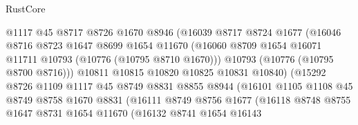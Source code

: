 \begin{lexlean}{RustCore}
\begin{coremodule}
                              @1117
                              @45
                              @8717
                              @8726
                              @1670
                              @8946
                              (@16039
                                @8717
                                @8724
                                @1677
                                (@16046
                                  @8716
                                  @8723
                                  @1647
                                  @8699
                                  @1654
                                  @11670
                                  (@16060
                                    @8709
                                    @1654
                                    @16071
                                    @11711
                                    @10793
                                    (@10776 (@10795 @8710 @1670)))
                                  @10793
                                  (@10776 (@10795 @8700 @8716)))
                                @10811
                                @10815
                                @10820
                                @10825
                                @10831
                                @10840)
                              (@15292
                                @8726
                                @1109
                                @1117
                                @45
                                @8749
                                @8831
                                @8855
                                @8944
                                (@16101
                                  @1105
                                  @1108
                                  @45
                                  @8749
                                  @8758
                                  @1670
                                  @8831
                                  (@16111
                                    @8749
                                    @8756
                                    @1677
                                    (@16118
                                      @8748
                                      @8755
                                      @1647
                                      @8731
                                      @1654
                                      @11670
                                      (@16132
                                        @8741
                                        @1654
                                        @16143

\end{coremodule}
\end{lexlean}
